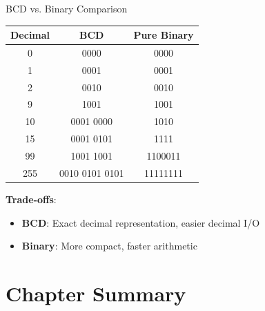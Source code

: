 \documentclass[aspectratio=169,11pt]{beamer}
\newcommand{\concept}[1]{\textbf{\color{accentcolor}#1}}
\begin{document}
\begin{frame}{BCD vs. Binary Comparison}
\begin{center}
\begin{tabular}{|c|c|c|}
\hline
\textbf{Decimal} & \textbf{BCD} & \textbf{Pure Binary} \\
\hline
0 & 0000 & 0000 \\
1 & 0001 & 0001 \\
2 & 0010 & 0010 \\
9 & 1001 & 1001 \\
10 & 0001 0000 & 1010 \\
15 & 0001 0101 & 1111 \\
99 & 1001 1001 & 1100011 \\
255 & 0010 0101 0101 & 11111111 \\
\hline
\end{tabular}
\end{center}

\vspace{0.3cm}
\concept{Trade-offs}:
\begin{itemize}
\item \textbf{BCD}: Exact decimal representation, easier decimal I/O
\item \textbf{Binary}: More compact, faster arithmetic
\end{itemize}
\end{frame}

\section{Chapter Summary}
\end{document}
